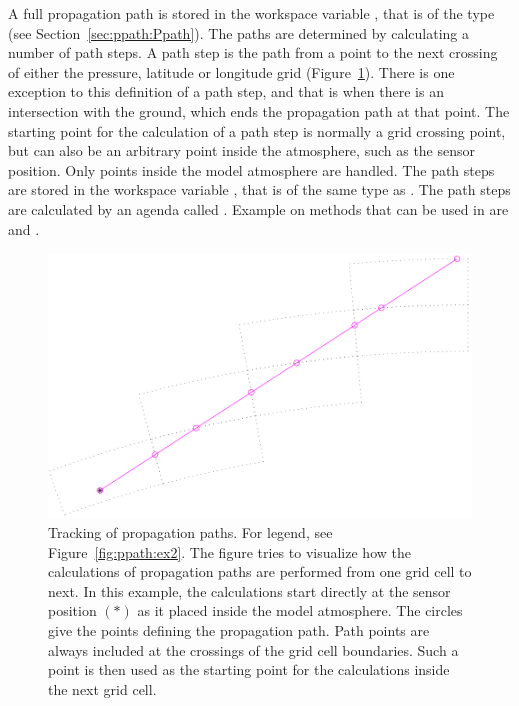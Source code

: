 A full propagation path is stored in the workspace variable
, that is of the type  (see
Section~\ref{sec:ppath:Ppath}). The paths are determined by
calculating a number of path steps. A path step is the path from a
point to the next crossing of either the pressure, latitude or
longitude grid (Figure~\ref{fig:ppath:ex1}). There is one exception to
this definition of a path step, and that is when there is an
intersection with the ground, which ends the propagation path at that
point. The starting point for the calculation of a path step is
normally a grid crossing point, but can also be an arbitrary point
inside the atmosphere, such as the sensor position. Only points inside
the model atmosphere are handled. The path steps are stored in the
workspace variable , that is of the same type as
. The path steps are calculated by an agenda called
. Example on methods that can be used in
 are 
and .

\begin{figure}[!t]
 \begin{center}
  \includegraphics*[width=0.80\hsize]{Figs/ppath/ppath_ex1}
  \caption{Tracking of propagation paths. For legend, see 
    Figure~\ref{fig:ppath:ex2}. The figure tries to visualize how the
    calculations of propagation paths are performed from one grid cell
    to next. In this example, the calculations start directly at the
    sensor position $(\ast)$ as it placed inside the model
    atmosphere. The circles give the points defining the propagation
    path. Path points are always included at the crossings of the grid
    cell boundaries. Such a point is then used as the starting point
    for the calculations inside the next grid cell. }
  \label{fig:ppath:ex1}  
 \end{center}
\end{figure}

